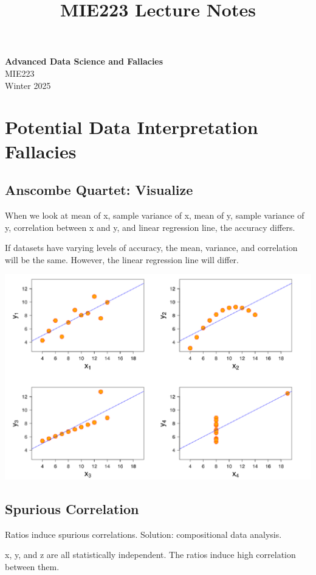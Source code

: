 \documentclass[11pt]{article}
\theoremstyle{definition}
\begin{document}
\setcounter{section}{0}
\title{MIE223 Lecture Notes}

\thispagestyle{empty}

\begin{center}
{\LARGE \bf Advanced Data Science and Fallacies}\\
{\large MIE223}\\
Winter 2025
\end{center}

\section{Potential Data Interpretation Fallacies}
\subsection{Anscombe Quartet: Visualize}
When we look at mean of x, sample variance of x, mean of y, sample variance of y,
correlation between x and y, and linear regression line, the accuracy differs.

If datasets have varying levels of accuracy, the mean, variance, and correlation will be the same. However, the linear regression line will differ.

\includegraphics[width=\textwidth]{27.png}

\subsection{Spurious Correlation}

Ratios induce spurious correlations. Solution: compositional data analysis.

x, y, and z are all statistically independent. 
The ratios induce high correlation between them.
\end{document}

